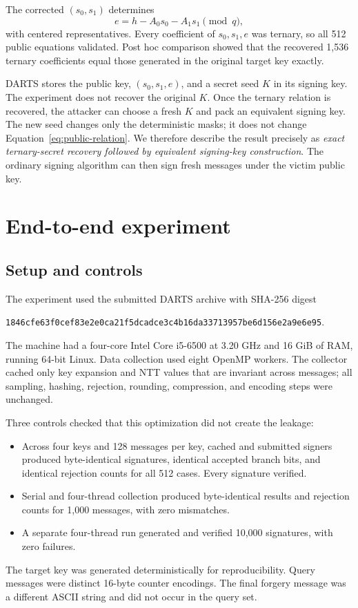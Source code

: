 \documentclass[11pt,a4paper]{article}
\begin{document}
The corrected $(s_0,s_1)$ determines
\begin{equation}
            e=h-A_0s_0-A_1s_1\pmod q,
\label{eq:derive-e}
\end{equation}
with centered representatives.  Every coefficient of $s_0,s_1,e$ was
ternary, so all 512 public equations validated.  Post hoc comparison showed
that the recovered 1,536 ternary coefficients equal those generated in the
original target key exactly.

DARTS stores the public key, $(s_0,s_1,e)$, and a secret seed $K$ in its
signing key.  The experiment does not recover the original $K$.  Once the
ternary relation is recovered, the attacker can choose a fresh $K$ and pack
an equivalent signing key.  The new seed changes only the deterministic
masks; it does not change Equation~\eqref{eq:public-relation}.  We therefore
describe the result precisely as \emph{exact ternary-secret recovery followed
by equivalent signing-key construction}.  The ordinary signing algorithm can
then sign fresh messages under the victim public key.

\section{End-to-end experiment}
\label{sec:experiment}

\subsection{Setup and controls}

The experiment used the submitted DARTS archive with SHA-256 digest
\begin{center}
\small\texttt{1846cfe63f0cef83e2e0ca21f5dcadce3c4b16da33713957be6d156e2a9e6e95}.
\end{center}
The machine had a four-core Intel Core i5-6500 at 3.20 GHz and 16 GiB of RAM,
running 64-bit Linux.  Data collection used eight OpenMP workers.  The
collector cached only key expansion and NTT values that are invariant across
messages; all sampling, hashing, rejection, rounding, compression, and
encoding steps were unchanged.

Three controls checked that this optimization did not create the leakage:
\begin{itemize}[leftmargin=1.5em]
  \item Across four keys and 128 messages per key, cached and submitted
        signers produced byte-identical signatures, identical accepted branch
        bits, and identical rejection counts for all 512 cases.  Every
        signature verified.
  \item Serial and four-thread collection produced byte-identical results and
        rejection counts for 1,000 messages, with zero mismatches.
  \item A separate four-thread run generated and verified 10,000 signatures,
        with zero failures.
\end{itemize}
The target key was generated deterministically for reproducibility.  Query
messages were distinct 16-byte counter encodings.  The final forgery message
was a different ASCII string and did not occur in the query set.
\end{document}
